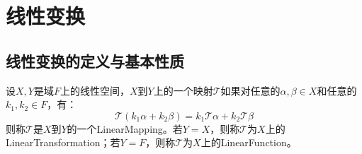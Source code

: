 \section{线性变换}

\subsection{线性变换的定义与基本性质}
\begin{definition}
	设$X,Y$是域$F$上的线性空间，$X$到$Y$上的一个映射$\mathcal{T}$如果对任意的$\alpha,\beta\in X$和任意的$k_1,k_2\in F$，有：
	\begin{equation*}
		\mathcal{T}(k_1\alpha+k_2\beta)=k_1\mathcal{T}\alpha+k_2\mathcal{T}\beta
	\end{equation*}
	则称$\mathcal{T}$是$X$到$Y$的一个\gls{LinearMapping}。若$Y=X$，则称$\mathcal{T}$为$X$上的\gls{LinearTransformation}；若$Y=F$，则称$\mathcal{T}$为$X$上的\gls{LinearFunction}。
\end{definition}
